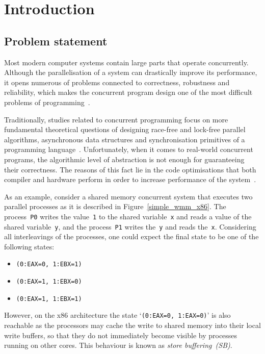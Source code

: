 \chapter{Introduction}
\label{ch:intro}


\section{Problem statement}
\label{ch:intro:problem}

Most modern computer systems contain large parts that operate concurrently.
Although the parallelisation of a system can drastically improve its performance, it opens numerous of problems connected to correctness, robustness and reliability, which makes the concurrent program design one of the most difficult problems of programming~\cite{mckenney2017parallel}.

Traditionally, studies related to concurrent programming focus on more fundamental theoretical questions of designing race-free and lock-free parallel algorithms, asynchronous data structures and synchronisation primitives of a programming language~\cite{ben2006principles}.
Unfortunately, when it comes to real-world concurrent programs, the algorithmic level of abstraction is not enough for guaranteeing their correctness.
The reasons of this fact lie in the code optimisations that both compiler and hardware perform in order to increase performance of the system~\cite{adve1996shared}.

As an example, consider a shared memory concurrent system that executes two parallel processes as it is described in Figure~\ref{simple_wmm_x86}.
The process~\texttt{P0} writes the value~\texttt{1} to the shared variable~\texttt{x} and reads a value of the shared variable~\texttt{y}, and the process~\texttt{P1} writes the~\texttt{y} and reads the~\texttt{x}.
Considering all interleavings of the processes, one could expect the final state to be one of the following states:
\begin{itemize}[noitemsep,topsep=0pt]
\item \texttt{(0:EAX=0,\,1:EBX=1)}
\item \texttt{(0:EAX=1,\,1:EBX=0)}
\item \texttt{(0:EAX=1,\,1:EBX=1)}
\end{itemize}
However, on the x86 architecture the state `\texttt{(0:EAX=0,\,1:EAX=0)}' is also reachable as the processors may cache the write to shared memory into their local write buffers, so that they do not immediately become visible by processes running on other cores.
This behaviour is known as \textit{store buffering~(SB)}.

